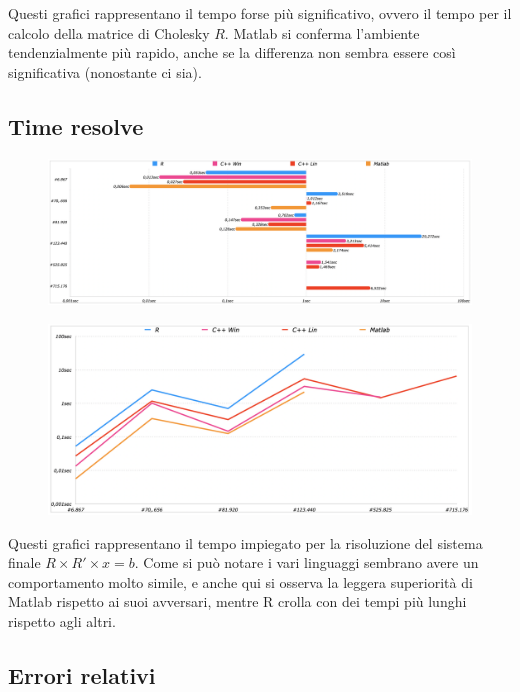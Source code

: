\documentclass[preprint,12pt]{elsarticle}
\begin{document}
Questi grafici rappresentano il tempo forse più significativo, ovvero il tempo per il calcolo della matrice di Cholesky $R$.
Matlab si conferma l'ambiente tendenzialmente più rapido, anche se la differenza non sembra essere così significativa (nonostante ci sia).

\subsection{Time resolve}

\begin{figure}[H]
	\centering
	\includegraphics[width=\linewidth]{solving1}
\end{figure}

\begin{figure}[H]
	\centering
	\includegraphics[width=\linewidth]{solving2}
\end{figure}

Questi grafici rappresentano il tempo impiegato per la risoluzione del sistema finale $R \times R' \times x = b$.
Come si può notare i vari linguaggi sembrano avere un comportamento molto simile, e anche qui si osserva la leggera superiorità di Matlab rispetto ai suoi avversari, mentre R crolla con dei tempi più lunghi rispetto agli altri.

\subsection{Errori relativi}
\end{document}
